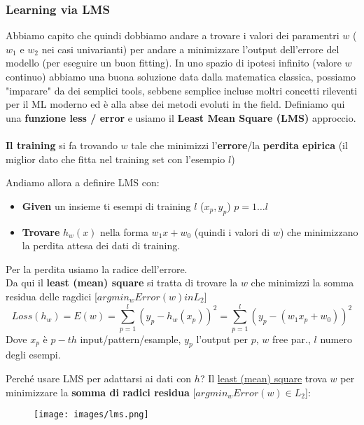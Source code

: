 \subsubsection{Learning via LMS}
Abbiamo capito che quindi dobbiamo andare a trovare i valori dei paramentri $w$ ($w_1$ e $w_2$ nei casi univarianti) per andare a minimizzare 
l'output dell'errore del modello (per eseguire un buon fitting). In uno spazio di ipotesi infinito (valore $w$ continuo) abbiamo una buona soluzione
data dalla matematica classica, possiamo "imparare" da dei semplici tools, sebbene semplice incluse moltri concetti rileventi per
il ML moderno ed è alla abse dei metodi evoluti in the field. Definiamo qui una \textbf{funzione less / error} e usiamo il \textbf{Least Mean Square (LMS)} approccio.\\\\
\textbf{Il training} si fa trovando $w$ tale che minimizzi l'\textbf{errore}/la \textbf{perdita epirica} (il miglior dato che fitta nel training set con l'esempio $l$)

\begin{definition}
    Andiamo allora a definire LMS con:
    \begin{itemize}
        \item \textbf{Given} un insieme ti esempi di training $l$ ($x_p, y_p$) $p = 1 \dots l$
        \item \textbf{Trovare} $h_w(x)$ nella forma $w_1 x + w_0$ (quindi i valori di $w$) che minimizzano la perdita attesa dei dati di training.
    \end{itemize}
    Per la perdita usiamo la radice dell'errore.\\
    Da qui il \textbf{least (mean) square} si tratta di trovare la $w$ che minimizzi la somma residua delle ragdici [$argmin_w Error(w) in L_2$]
    $$Loss(h_w) = E(w) = \sum_{p=1}^{l} (y_p - h_w(x_p))^2 = \sum_{p=1}^{l}(y_p - (w_1 x_p + w_0))^2$$
    Dove $x_p$ è $p-th$ input/pattern/esample, $y_p$ l'output per $p$, $w$ free par., $l$ numero degli esempi.
\end{definition}
\hspace{-15pt}Perché usare LMS per adattarsi ai dati con $h$? Il \underline{least (mean) square} trova $w$ per minimizzare la \textbf{somma di radici residua} [$argmin_w Error(w) \in L_2$]:
\begin{figure}[h!]
    \centering
    \texttt{[image: images/lms.png]}
\end{figure}


